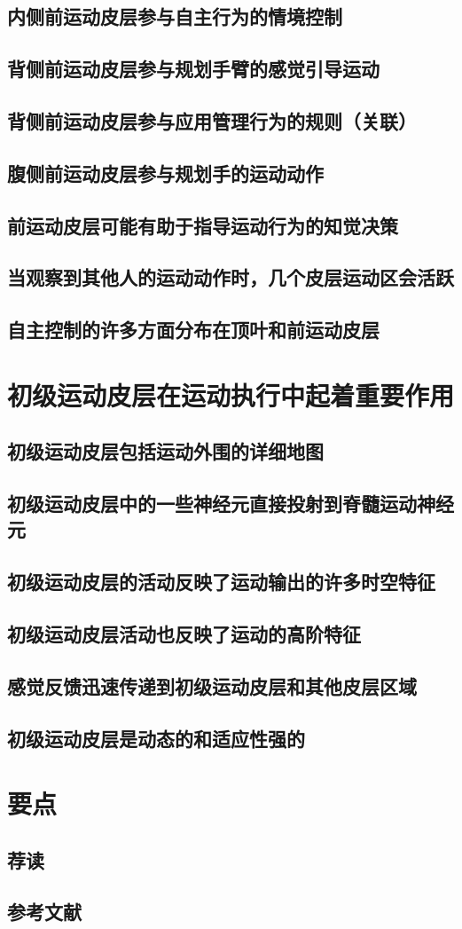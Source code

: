 \subsection{内侧前运动皮层参与自主行为的情境控制}
\subsection{背侧前运动皮层参与规划手臂的感觉引导运动}
\subsection{背侧前运动皮层参与应用管理行为的规则（关联）}
\subsection{腹侧前运动皮层参与规划手的运动动作}
\subsection{前运动皮层可能有助于指导运动行为的知觉决策}
\subsection{当观察到其他人的运动动作时，几个皮层运动区会活跃}
\subsection{自主控制的许多方面分布在顶叶和前运动皮层}

\section{初级运动皮层在运动执行中起着重要作用}
\subsection{初级运动皮层包括运动外围的详细地图}
\subsection{初级运动皮层中的一些神经元直接投射到脊髓运动神经元}
\subsection{初级运动皮层的活动反映了运动输出的许多时空特征}
\subsection{初级运动皮层活动也反映了运动的高阶特征}
\subsection{感觉反馈迅速传递到初级运动皮层和其他皮层区域}
\subsection{初级运动皮层是动态的和适应性强的}

\section{要点}
\subsection{荐读}
\subsection{参考文献}